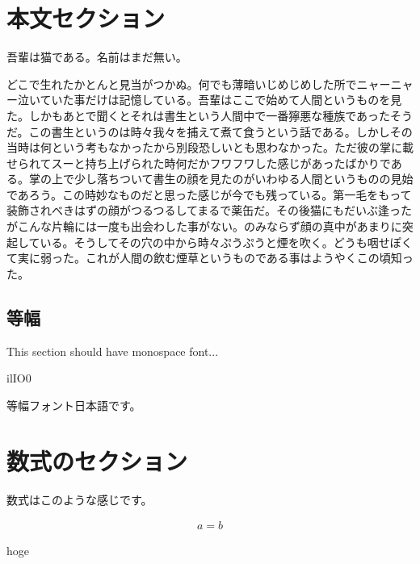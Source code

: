 \section{本文セクション}

吾輩は猫である。名前はまだ無い。

どこで生れたかとんと見当がつかぬ。何でも薄暗いじめじめした所でニャーニャー泣いていた事だけは記憶している。吾輩はここで始めて人間というものを見た。しかもあとで聞くとそれは書生という人間中で一番獰悪な種族であったそうだ。この書生というのは時々我々を捕えて煮て食うという話である。しかしその当時は何という考もなかったから別段恐しいとも思わなかった。ただ彼の掌に載せられてスーと持ち上げられた時何だかフワフワした感じがあったばかりである。掌の上で少し落ちついて書生の顔を見たのがいわゆる人間というものの見始であろう。この時妙なものだと思った感じが今でも残っている。第一毛をもって装飾されべきはずの顔がつるつるしてまるで薬缶だ。その後猫にもだいぶ逢ったがこんな片輪には一度も出会わした事がない。のみならず顔の真中があまりに突起している。そうしてその穴の中から時々ぷうぷうと煙を吹く。どうも咽せぽくて実に弱った。これが人間の飲む煙草というものである事はようやくこの頃知った。

\subsection{\ttfamily 等幅}
{\ttfamily
 This section should have monospace font...

 ilIO0

 等幅フォント日本語です。
}

\section{数式のセクション}

数式はこのような感じです。

\begin{align}
    a=b \label{foo}
\end{align}

hoge


\cite{_article, _book, _misc, _incollection, _inproceedings, _techreport}
